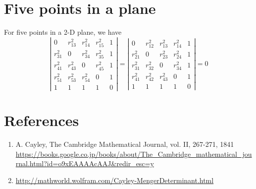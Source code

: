 \documentclass{article}
\begin{document}
\section{Five points in a plane}
\label{sec-5}
For five points in a 2-D plane, we have
\begin{equation}
\label{}
\left|\begin{array}{ccccc}
0 &  r_{13}^2 & r_{14}^2 & r_{15}^2 & 1 \\
r_{31}^2 &  0 & r_{34}^2 & r_{35}^2 & 1 \\
r_{41}^2 &  r_{43}^2 & 0 & r_{45}^2 & 1 \\
r_{51}^2 &  r_{53}^2 & r_{54}^2 & 0 & 1 \\
 1 & 1 & 1 & 1 & 0  
\end{array}\right|=
\left|\begin{array}{ccccc}
0 &  r_{12}^2 & r_{13}^2 & r_{14}^2 & 1 \\
r_{21}^2 &  0 & r_{23}^2 & r_{24}^2 & 1 \\
r_{31}^2 &  r_{32}^2 & 0 & r_{34}^2 & 1 \\
r_{41}^2 &  r_{42}^2 & r_{43}^2 & 0 & 1 \\
 1 & 1 & 1 & 1 & 0  
\end{array}\right|=0
\end{equation} 

\section{References}
\label{sec-6}
\begin{enumerate}
\item A. Cayley, The Cambridge Mathematical Journal, vol. II, 267-271, 1841 \url{https://books.google.co.jp/books/about/The_Cambridge_mathematical_journal.html?id=o9xEAAAAcAAJ&redir_esc=y}
\item \url{http://mathworld.wolfram.com/Cayley-MengerDeterminant.html}
\end{enumerate}
\end{document}

